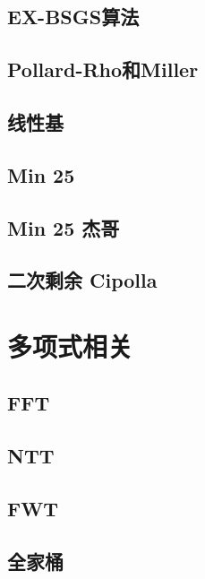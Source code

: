 \documentclass[a4paper,12pt]{article}
\begin{document}
\subsection{EX-BSGS算法}

\subsection{Pollard-Rho和Miller}

\subsection{线性基}



\subsection{Min 25}

\subsection{Min 25 杰哥}

\subsection{二次剩余 Cipolla}


\section{多项式相关}

\subsection{FFT}

\subsection{NTT}

\subsection{FWT}

\subsection{全家桶}

\end{document}
